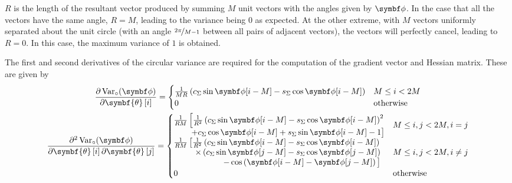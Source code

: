 $R$ is the length of the resultant vector produced by summing $M$ unit vectors
with the angles given by $\bdphi$. In the case that all the vectors have the
same angle, $R=M$, leading to the variance being $0$ as expected. At the other
extreme, with $M$ vectors uniformly separated about the unit circle (with an
angle $\nicefrac{2 \pi}{M - 1}$ between all pairs of adjacent vectors), the
vectors will perfectly cancel, leading to $R=0$. In this case, the maximum
variance of $1$ is obtained.

The first and second derivatives of the circular variance are required for
the computation of the gradient vector and Hessian matrix. These are given by
\begin{subequations}
    \begin{gather}
        \frac{\partial \circvar}{\partial \symbf{\theta}\left[i\right]} =
        \begin{cases}
            \frac{1}{MR}
            \left(
                c_{\Sigma} \sin \bdphi[i-M] -
                s_{\Sigma} \cos \bdphi[i-M]
            \right) & M \leq i < 2M\\
            0 & \text{otherwise}
        \end{cases}\\
        \frac{\partial^2 \circvar}{\partial \symbf{\theta}\left[i\right]\partial \symbf{\theta}\left[j\right]} =
        \begin{cases}
            \begin{split}
                \tfrac{1}{RM}\left[
                    \tfrac{1}{R^2}
                \left(c_{\Sigma} \sin \bdphi[i-M]  - s_{\Sigma} \cos \bdphi[i-M] \right)^2 \right. \\
                    \left. + c_{\Sigma} \cos \bdphi[i-M] + s_{\Sigma} \sin \bdphi[i-M]
                    - 1
                \vphantom{\tfrac{1}{RM}}\right]
            \end{split}
            & M \leq i, j < 2M, i = j\\
            \begin{split}
                \tfrac{1}{RM}\left[
                    \tfrac{1}{R^2}
                    \left(c_{\Sigma} \sin \bdphi[i-M] - s_{\Sigma} \cos \bdphi[i-M] \right) \right.\\
                    \times \left(c_{\Sigma} \sin \bdphi[j-M] - s_{\Sigma} \cos \bdphi[j-M] \right) \\
                    \left. - \cos\left( \bdphi[i-M] - \bdphi[j-M] \right)
                    \vphantom{\tfrac{1}{R^2}}
                \right]
            \end{split}
            & M \leq i, j < 2M, i \neq j\\
            0 & \text{otherwise}
        \end{cases}
    \end{gather}
\end{subequations}

